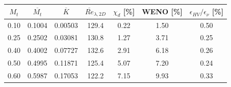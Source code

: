 \begin{tabular}{ccccccc}
\hline
$M_t$ & $\overline{M_t}$ & $\overline{K}$ & $\overline{Re}_{\lambda,2D}$ & $\chi_d$ [\%] & WENO [\%] & $\epsilon_{HV}/\epsilon_{\nu}$ [\%] \\
\hline
0.10 & 0.1004 & 0.00503 & 129.4 & 0.22 & 1.50 & 0.50 \\
0.25 & 0.2502 & 0.03081 & 130.8 & 1.27 & 3.71 & 0.25 \\
0.40 & 0.4002 & 0.07727 & 132.6 & 2.91 & 6.18 & 0.26 \\
0.50 & 0.4995 & 0.11871 & 125.4 & 5.07 & 7.20 & 0.24 \\
0.60 & 0.5987 & 0.17053 & 122.2 & 7.15 & 9.93 & 0.33 \\
\hline
\end{tabular}
